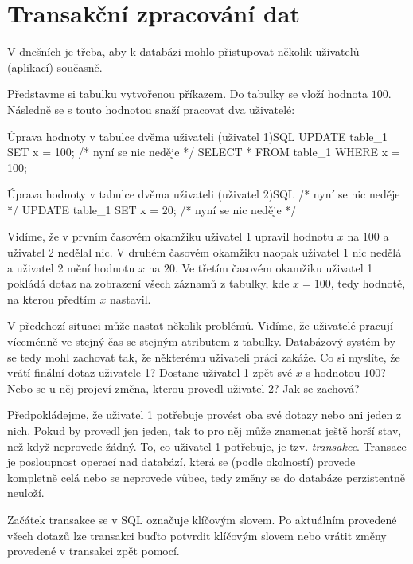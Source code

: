 \section{Transakční zpracování dat}
V dnešních  je třeba, aby k databázi mohlo přistupovat několik uživatelů (aplikací) současně.
\begin{upexample}
Představme si tabulku vytvořenou příkazem. Do tabulky se vloží hodnota $100$. Následně se s touto hodnotou snaží pracovat dva uživatelé:
\begin{upcode}{Úprava hodnoty v tabulce dvěma uživateli (uživatel 1)}{}{SQL}
UPDATE table_1 SET x = 100;
/* nyní se nic neděje */
SELECT * FROM table_1 WHERE x = 100;
\end{upcode}
\begin{upcode}{Úprava hodnoty v tabulce dvěma uživateli (uživatel 2)}{}{SQL}
/* nyní se nic neděje */
UPDATE table_1 SET x = 20;
/* nyní se nic neděje */
\end{upcode}
Vidíme, že v prvním časovém okamžiku uživatel 1 upravil hodnotu $x$ na $100$ a uživatel 2 nedělal nic. V druhém časovém okamžiku naopak uživatel 1 nic nedělá a uživatel 2 mění hodnotu $x$ na $20$. Ve třetím časovém okamžiku uživatel 1 pokládá dotaz na zobrazení všech záznamů z tabulky, kde $x = 100$, tedy hodnotě, na kterou předtím $x$ nastavil.

V předchozí situaci může nastat několik problémů. Vidíme, že uživatelé pracují víceménně ve stejný čas se stejným atributem z tabulky. Databázový systém by se tedy mohl zachovat tak, že některému uživateli práci zakáže. Co si myslíte, že vrátí finální dotaz uživatele 1? Dostane uživatel 1 zpět své $x$ s hodnotou $100$? Nebo se u něj projeví změna, kterou provedl uživatel 2? Jak se  zachová?

Předpokládejme, že uživatel 1 potřebuje provést oba své dotazy nebo ani jeden z nich. Pokud by provedl jen jeden, tak to pro něj může znamenat ještě horší stav, než když neprovede žádný. To, co uživatel 1 potřebuje, je tzv. \textit{transakce}. Transace je posloupnost operací nad databází, která se (podle okolností) provede kompletně celá nebo se neprovede vůbec, tedy změny se do databáze perzistentně neuloží.

Začátek transakce se v SQL označuje klíčovým slovem. Po aktuálním provedené všech dotazů lze transakci buďto potvrdit klíčovým slovem nebo vrátit změny provedené v transakci zpět pomocí.
\end{upexample}

